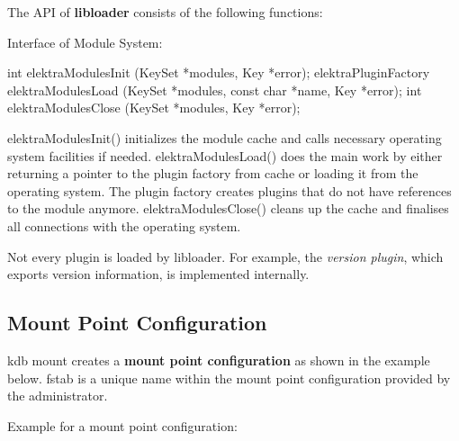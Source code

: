The A\+PI of {\bfseries libloader} consists of the following functions\+:

Interface of Module System\+:


\begin{DoxyCode}
\textcolor{keywordtype}{int} elektraModulesInit (KeySet *modules, Key *error);
elektraPluginFactory elektraModulesLoad (KeySet *modules,
                \textcolor{keyword}{const} \textcolor{keywordtype}{char} *name, Key *error);
\textcolor{keywordtype}{int} elektraModulesClose (KeySet *modules, Key *error);
\end{DoxyCode}


{\ttfamily elektra\+Modules\+Init()} initializes the module cache and calls necessary operating system facilities if needed. {\ttfamily elektra\+Modules\+Load()} does the main work by either returning a pointer to the plugin factory from cache or loading it from the operating system. The plugin factory creates plugins that do not have references to the module anymore. {\ttfamily elektra\+Modules\+Close()} cleans up the cache and finalises all connections with the operating system.

Not every plugin is loaded by {\ttfamily libloader}. For example, the {\itshape version plugin}, which exports version information, is implemented internally.

\subsection*{Mount Point Configuration}

{\ttfamily kdb mount} creates a {\bfseries mount point configuration} as shown in the example below. {\ttfamily fstab} is a unique name within the mount point configuration provided by the administrator.

Example for a mount point configuration\+:


